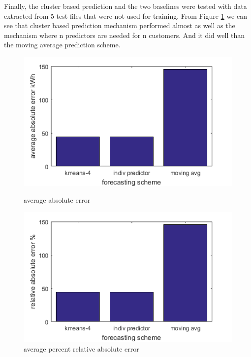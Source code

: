 Finally, the cluster based prediction and the two baselines were tested with data extracted from 5 test files that were not used for training. From Figure \ref{fig:prediction-scheme-vs-error} we can see that cluster based prediction mechanism performed almost as well as the mechanism where n predictors are needed for n customers. And it did well than the moving average prediction scheme.



\begin{figure}[h!]
\centering
\begin{minipage}{.5\textwidth}
  \centering
  \includegraphics[width=\linewidth]{final-avg-abs-error.png}
  \caption{average absolute error}
  \label{fig:prediction-scheme-vs-error}
\end{minipage}%
\begin{minipage}{.5\textwidth}
  \centering
  \includegraphics[width=\linewidth]{final-relative-abs-error.png}
  \caption{average percent relative absolute error}
\end{minipage}

  
\end{figure}